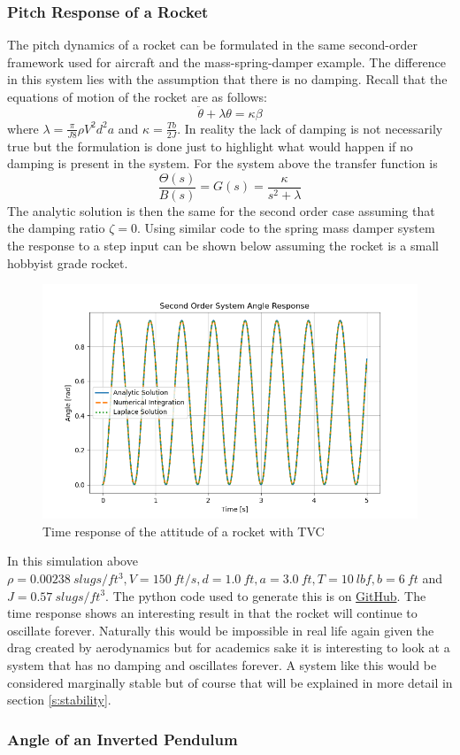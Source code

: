\subsubsection{Pitch Response of a Rocket}\label{s:rocket_response}

The pitch dynamics of a rocket can be formulated in the same second-order framework used for aircraft and the mass-spring-damper example. The difference in this system lies with the assumption that there is no damping. Recall that the equations of motion of the rocket are as follows:
\begin{equation}
    \ddot{\theta} + \lambda \theta = \kappa \beta
\end{equation}
where $\lambda=\frac{\pi}{J8}\rho V^2 d^2 a$ and $\kappa=\frac{Tb}{2J}$. In reality the lack of damping is not necessarily true but the formulation is done just to highlight what would happen if no damping is present in the system. For the system above the transfer function is
\begin{equation}
  \frac{\Theta(s)}{B(s)} = G(s) = \frac{\kappa}{s^2+\lambda}
\end{equation}
The analytic solution is then the same for the second order case assuming that the damping ratio $\zeta=0$. Using similar code to the spring mass damper system the response to a step input can be shown below assuming the rocket is a small hobbyist grade rocket. 
\begin{figure}[H]
\centering
\includegraphics[width=0.8\linewidth]{Figures/rocket_response.png}
\caption{Time response of the attitude of a rocket with TVC}
\label{f:rocket_response}
\end{figure}
\noindent In this simulation above $\rho=0.00238~slugs/ft^3,V=150~ft/s,d=1.0~ft,a=3.0~ft,T=10~lbf,b=6~ft$ and $J=0.57~slugs/ft^3$. The python code used to generate this is on \href{https://github.com/cmontalvo251/Python/blob/master/controls/rocket.py}{GitHub}. The time response shows an interesting result in that the rocket will continue to oscillate forever. Naturally this would be impossible in real life again given the drag created by aerodynamics but for academics sake it is interesting to look at a system that has no damping and oscillates forever. A system like this would be considered marginally stable but of course that will be explained in more detail in section \ref{s:stability}.

\subsubsection{Angle of an Inverted Pendulum}

